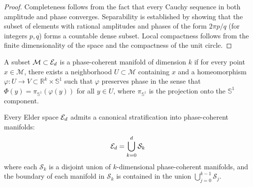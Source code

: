 \begin{proof}
Completeness follows from the fact that every Cauchy sequence in both amplitude and phase converges. Separability is established by showing that the subset of elements with rational amplitudes and phases of the form $2\pi p/q$ (for integers $p,q$) forms a countable dense subset. Local compactness follows from the finite dimensionality of the space and the compactness of the unit circle.
\end{proof}

\begin{definition}
A subset $\mathcal{M} \subset \mathcal{E}_{d}$ is a phase-coherent manifold of dimension $k$ if for every point $x \in \mathcal{M}$, there exists a neighborhood $U \subset \mathcal{M}$ containing $x$ and a homeomorphism $\varphi: U \rightarrow V \subset \mathbb{R}^k \times \mathbb{S}^1$ such that $\varphi$ preserves phase in the sense that $\Phi(y) = \pi_{\mathbb{S}^1}(\varphi(y))$ for all $y \in U$, where $\pi_{\mathbb{S}^1}$ is the projection onto the $\mathbb{S}^1$ component.
\end{definition}

\begin{theorem}
Every Elder space $\mathcal{E}_{d}$ admits a canonical stratification into phase-coherent manifolds:
\begin{equation}
\mathcal{E}_{d} = \bigcup_{k=0}^{d} \mathcal{S}_k
\end{equation}
where each $\mathcal{S}_k$ is a disjoint union of $k$-dimensional phase-coherent manifolds, and the boundary of each manifold in $\mathcal{S}_k$ is contained in the union $\bigcup_{j=0}^{k-1} \mathcal{S}_j$.
\end{theorem}

